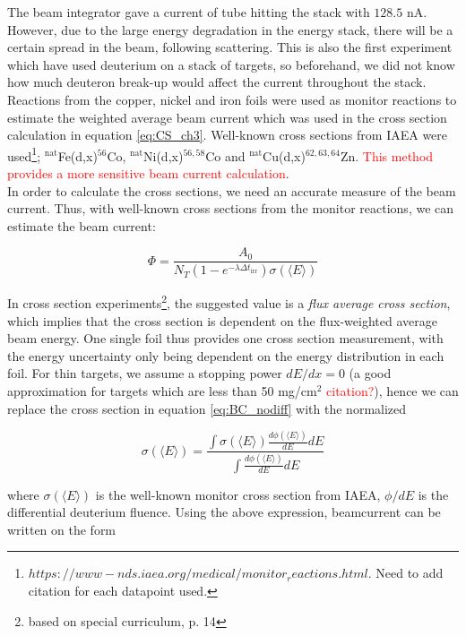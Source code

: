 \documentclass[a4paper,11pt,twoside]{book}
\begin{document}
The beam integrator gave a current of tube hitting the stack with $128.5$ nA. However, due to the large energy degradation in the energy stack, there will be a certain spread in the beam, following scattering. This is also the first experiment which have used deuterium on a stack of targets, so beforehand, we did not know how much deuteron break-up would affect the current throughout the stack. Reactions from the copper, nickel and iron foils were used as monitor reactions to estimate the weighted average beam current which was used in the cross section calculation in equation \ref{eq:CS_ch3}. Well-known cross sections from IAEA were used\footnote{$https://www-nds.iaea.org/medical/monitor_reactions.html$. Need to add citation for each datapoint used.}; $^{\text{nat}}$Fe(d,x)$^{56}$Co, $^{\text{nat}}$Ni(d,x)$^{56,58}$Co and $^{\text{nat}}$Cu(d,x)$^{62,63,64}$Zn. \textcolor{red}{This method provides a more sensitive beam current calculation}. \\ 

\noindent 
In order to calculate the cross sections, we need an accurate measure of the beam current. Thus, with well-known cross sections from the monitor reactions, we can estimate the beam current: 

\begin{equation} \label{eq:BC_nodiff}
    \Phi = \frac{A_0}{N_T (1-e^{-\lambda \Delta t_\text{irr}})\sigma(\langle E\rangle)}
\end{equation}

\noindent 
In cross section experiments\footnote{based on special curriculum, p. 14}, the suggested value is a \textit{flux average cross section}, which implies that the cross section is dependent on the flux-weighted average beam energy. One single foil thus provides one cross section measurement, with the energy uncertainty only being dependent on the energy distribution in each foil. For thin targets, we assume a stopping power $dE/dx=0$ (a good approximation for targets which are less than 50 mg/cm$^2$ \textcolor{red}{citation?}), hence we can replace the cross section in equation \ref{eq:BC_nodiff} with the normalized 

\begin{equation}
    \sigma(\langle E \rangle) = \frac{\int \sigma(\langle E \rangle) \frac{d\phi(\langle E \rangle)}{dE}dE}{\int \frac{d\phi(\langle E \rangle)}{dE}dE}
\end{equation}

\noindent where $\sigma(\langle E \rangle)$ is the well-known monitor cross section from IAEA, $\phi/dE$ is the differential deuterium fluence.  Using the above expression, beamcurrent can be written on the form 
\end{document}
